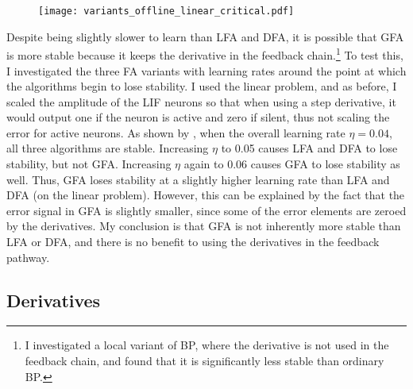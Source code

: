 \begin{figure}
  \centering
  \texttt{[image: variants\_offline\_linear\_critical.pdf]}
  \vspace*{-2.5em}
\end{figure}

Despite being slightly slower to learn than LFA and DFA,
it is possible that GFA is more stable
because it keeps the derivative in the feedback chain.\footnote{
  I investigated a local variant of BP,
  where the derivative is not used in the feedback chain,
  and found that it is significantly less stable than ordinary BP.}
To test this, I investigated the three FA variants with learning rates
around the point at which the algorithms begin to lose stability.
I used the linear problem,
and as before, I scaled the amplitude of the LIF neurons
so that when using a step derivative,
it would output one if the neuron is active and zero if silent,
thus not scaling the error for active neurons.
As shown by ,
when the overall learning rate $\eta = 0.04$,
all three algorithms are stable.
Increasing $\eta$ to 0.05 causes LFA and DFA to lose stability, but not GFA.
Increasing $\eta$ again to 0.06 causes GFA to lose stability as well.
Thus, GFA loses stability at a slightly higher learning rate than LFA and DFA
(on the linear problem).
However, this can be explained by the fact that the error signal in GFA is
slightly smaller,
since some of the error elements are zeroed by the derivatives.
My conclusion is that GFA is not inherently more stable than LFA or DFA,
and there is no benefit to using the derivatives in the feedback pathway.


\subsection{Derivatives}

